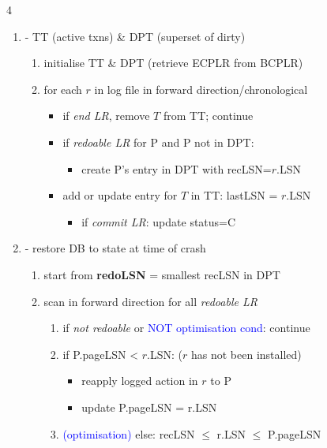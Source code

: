 \documentclass{article}
\begin{document}
\begin{multicols*}{4}
\begin{scriptsize}
  \begin{enumerate}
    \item {} - TT (active txns) \& DPT (superset of dirty)
      \begin{enumerate}
        \item initialise TT \& DPT (retrieve ECPLR from BCPLR)
        \item for each $r$ in log file in forward direction/chronological
          \begin{itemize}
            \item if \textit{end LR}, remove $T$ from TT; continue
            \item if \textit{redoable LR} for P and P not in DPT:
              \begin{itemize}
                \item create P's entry in DPT with recLSN=$r$.LSN
              \end{itemize}
            \item add or update entry for $T$ in TT: lastLSN = $r$.LSN
              \begin{itemize}
                \item if \textit{commit LR}: update status=C
              \end{itemize}
          \end{itemize}
      \end{enumerate}
    \item {} - restore DB to state at time of crash
      \begin{enumerate}
        \item start from \textbf{redoLSN} = smallest recLSN in DPT
        \item scan in forward direction for all \textit{redoable LR}
          \begin{enumerate}
            \item if \textit{not redoable} or \textcolor{blue}{NOT optimisation cond}: continue
            \item if P.pageLSN < $r$.LSN: ($r$ has not been installed)
              \begin{itemize}
                \item reapply logged action in $r$ to P
                \item update P.pageLSN = r.LSN
              \end{itemize}
            \item \textcolor{blue}{(optimisation)} else: recLSN $\leq$ r.LSN $\leq$ P.pageLSN

\end{enumerate}
\end{enumerate}
\end{enumerate}
\end{scriptsize}
\end{multicols*}
\end{document}

